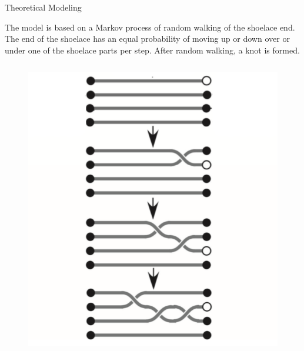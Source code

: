 \begin{frame}{Theoretical Modeling}

\begin{block}{}
The model is based on a Markov process of random walking of the shoelace end. The end of the shoelace has an equal probability of moving up or down over or under one of the shoelace parts per step. After random walking, a knot is formed.
\end{block}

\begin{columns}
\begin{column}{0.4\linewidth}
\begin{figure}[H]
\includegraphics[width=1\linewidth]{img/hnurki_zaput.png}
\end{figure}
\end{column}
\end{columns}
\end{frame}

